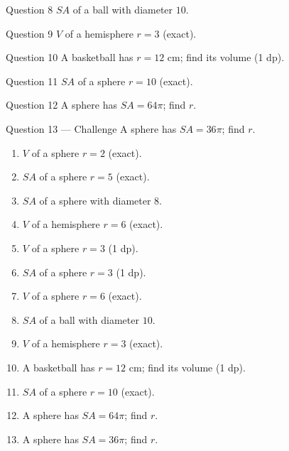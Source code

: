 \documentclass[11pt]{article}
\begin{document}
\begin{qbox}{Question 8}
$SA$ of a ball with diameter $10$.\workspace{2.0cm}
\end{qbox}

\begin{qbox}{Question 9}
$V$ of a hemisphere $r=3$ (exact).\workspace{2.0cm}
\end{qbox}

\begin{qbox}{Question 10}
A basketball has $r=12$ cm; find its volume (1 dp).\workspace{2.2cm}
\end{qbox}

\begin{qbox}{Question 11}
$SA$ of a sphere $r=10$ (exact).\workspace{1.8cm}
\end{qbox}

\begin{qbox}{Question 12}
A sphere has $SA=64\pi$; find $r$.\workspace{2.2cm}
\end{qbox}

\begin{qbox}{Question 13 --- Challenge}
A sphere has $SA=36\pi$; find $r$.\workspace{2.2cm}
\end{qbox}

\clearpage
{}

\begin{recapbox}
\begin{multicols}{2}
\small
\begin{enumerate}[leftmargin=*,itemsep=3pt]
  \item $V$ of a sphere $r=2$ (exact).
  \item $SA$ of a sphere $r=5$ (exact).
  \item $SA$ of a sphere with diameter $8$.
  \item $V$ of a hemisphere $r=6$ (exact).
  \item $V$ of a sphere $r=3$ (1 dp).
  \item $SA$ of a sphere $r=3$ (1 dp).
  \item $V$ of a sphere $r=6$ (exact).
  \item $SA$ of a ball with diameter $10$.
  \item $V$ of a hemisphere $r=3$ (exact).
  \item A basketball has $r=12$ cm; find its volume (1 dp).
  \item $SA$ of a sphere $r=10$ (exact).
  \item A sphere has $SA=64\pi$; find $r$.
  \item A sphere has $SA=36\pi$; find $r$.
\end{enumerate}
\end{multicols}
\end{recapbox}
\end{document}
